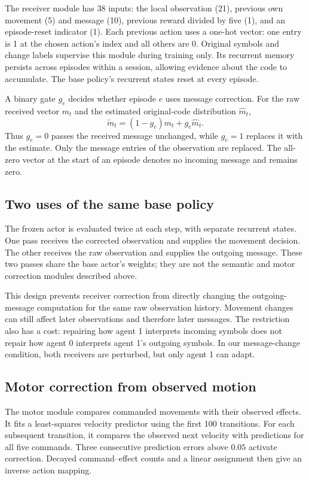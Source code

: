 \documentclass[10pt,a4paper]{article}
\begin{document}
The receiver module has 38 inputs: the local observation (21), previous own movement (5) and message (10), previous reward divided by five (1), and an episode-reset indicator (1). Each previous action uses a one-hot vector: one entry is 1 at the chosen action's index and all others are 0. Original symbols and change labels supervise this module during training only. Its recurrent memory persists across episodes within a session, allowing evidence about the code to accumulate. The base policy's recurrent states reset at every episode.

A binary gate $g_e$ decides whether episode $e$ uses message correction. For the raw received vector $m_t$ and the estimated original-code distribution $\hat m_t$,
\begin{equation}
 \tilde m_t=(1-g_e)m_t+g_e\hat m_t.
\end{equation}
Thus $g_e=0$ passes the received message unchanged, while $g_e=1$ replaces it with the estimate. Only the message entries of the observation are replaced. The all-zero vector at the start of an episode denotes no incoming message and remains zero.

\subsection{Two uses of the same base policy}
The frozen actor is evaluated twice at each step, with separate recurrent states. One pass receives the corrected observation and supplies the movement decision. The other receives the raw observation and supplies the outgoing message. These two passes share the base actor's weights; they are not the semantic and motor correction modules described above.

This design prevents receiver correction from directly changing the outgoing-message computation for the same raw observation history. Movement changes can still affect later observations and therefore later messages. The restriction also has a cost: repairing how agent 1 interprets incoming symbols does not repair how agent 0 interprets agent 1's outgoing symbols. In our message-change condition, both receivers are perturbed, but only agent 1 can adapt.

\subsection{Motor correction from observed motion}
The motor module compares commanded movements with their observed effects. It fits a least-squares velocity predictor using the first 100 transitions. For each subsequent transition, it compares the observed next velocity with predictions for all five commands. Three consecutive prediction errors above $0.05$ activate correction. Decayed command--effect counts and a linear assignment then give an inverse action mapping.
\end{document}

